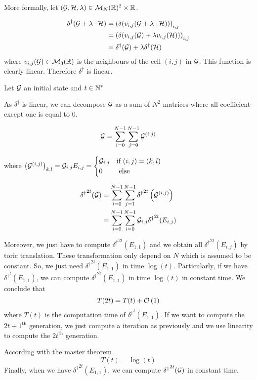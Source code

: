 More formally, let $(\mathcal{G},\mathcal{H},\lambda) \in \mathcal{M}_N(\mathbb{R})^2\times \mathbb{R}$.

$$
    \begin{aligned}
        \delta^\dagger(\mathcal{G}+\lambda\cdot\mathcal{H}) &= \left( \delta(v_{i,j}(\mathcal{G}+\lambda\cdot\mathcal{H})) \right)_{i,j}\\
        &= \left( \delta(v_{i,j}(\mathcal{G})+\lambda v_{i,j}(\mathcal{H})) \right)_{i,j}\\
        &= \delta^\dagger(\mathcal{G})+\lambda \delta^\dagger(\mathcal{H})
    \end{aligned}
$$
where $v_{i,j}(\mathcal{G}) \in \mathcal{M}_3(\mathbb{R})$ is the neighbours of the cell $(i,j)$ in $\mathcal{G}$. This function is clearly linear. Therefore $\delta^\dagger$ is linear.

Let $\mathcal{G}$ an initial state and $t\in\mathbb{N}^*$

As $\delta^\dagger$ is linear, we can decompose $\mathcal{G}$ as a sum of $N^2$ matrices where all coefficient except one is equal to 0. 

$$
    \mathcal{G}=\sum\limits_{i=0}^{N-1}\sum\limits_{j=0}^{N-1} \mathcal{G}^{(i,j)}
$$

where $\left(\mathcal{G}^{(i,j)}\right)_{k,l}=\mathcal{G}_{i,j}E_{i,j}=\begin{cases} \mathcal{G}_{i,j} & \text{if }(i,j)=(k,l)\\0&\text{ else} \end{cases}$

$$
    \begin{aligned}
        {\delta^\dagger}^{2t}(\mathcal{G}) &= \sum\limits_{i=0}^{N-1}\sum\limits_{j=1}^{N-1} {\delta^\dagger}^{2t}\left(\mathcal{G}^{(i,j)}\right)\\
        &= \sum\limits_{i=0}^{N-1} \sum\limits_{i=0}^{N-1} \mathcal{G}_{i,j} {\delta^\dagger}^{2t}(E_{i,j})
    \end{aligned}
$$

Moreover, we just have to compute ${\delta^\dagger}^{2t}(E_{1,1})$ and we obtain all ${\delta^\dagger}^{2t}(E_{i,j})$ by toric translation. These transformation only depend on $N$ which is assumed to be constant. So, we just need ${\delta^\dagger}^{2t}(E_{1,1})$ in time $\log(t)$. Particularly, if we have ${\delta^\dagger}^{t}(E_{1,1})$, we can compute ${\delta^\dagger}^{2t}(E_{1,1})$ in time $\log(t)$ in constant time. We conclude that
$$
    T(2t) = T(t) + \mathcal O \left( 1 \right)
$$
where $T(t)$ is the computation time of ${\delta^\dagger}^t(E_{1,1})$. If we want to compute the $2t+1^{\text{th}}$ generation, we just compute a iteration as previously and we use linearity to compute the $2t^{\text{th}}$ generation.

According with the master theorem
$$
    T(t)=\log(t)
$$
Finally, when we have ${\delta^\dagger}^{2t}(E_{1,1})$, we can compute ${\delta^\dagger}^{2t}(\mathcal{G})$ in constant time.

